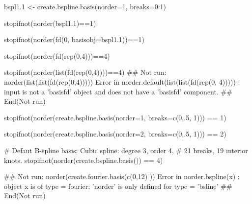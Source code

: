 \begin{Examples}
\begin{ExampleCode}
bspl1.1 <- create.bspline.basis(norder=1, breaks=0:1)

stopifnot(norder(bspl1.1)==1)

stopifnot(norder(fd(0, basisobj=bspl1.1))==1)

stopifnot(norder(fd(rep(0,4)))==4)

stopifnot(norder(list(fd(rep(0,4))))==4)
## Not run: 
norder(list(list(fd(rep(0,4)))))
Error in norder.default(list(list(fd(rep(0, 4))))) : 
  input is not a 'basisfd' object and does not have a 'basisfd'
component. 
## End(Not run)

stopifnot(norder(create.bspline.basis(norder=1, breaks=c(0,.5, 1))) == 1) 

stopifnot(norder(create.bspline.basis(norder=2, breaks=c(0,.5, 1))) == 2)

# Defaut B-spline basis:  Cubic spline:  degree 3, order 4,
# 21 breaks, 19 interior knots.  
stopifnot(norder(create.bspline.basis()) == 4)

## Not run: 
norder(create.fourier.basis(c(0,12) ))
Error in norder.bspline(x) : 
  object x is of type = fourier;  'norder' is only defined for type = 'bsline'
## End(Not run)

\end{ExampleCode}
\end{Examples}

